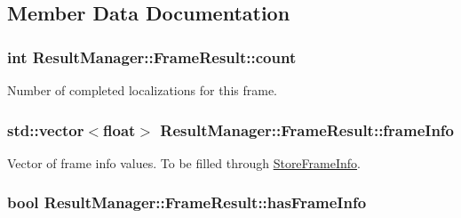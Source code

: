 \subsection{Member Data Documentation}
\subsubsection[{\texorpdfstring{count}{count}}]{\setlength{\rightskip}{0pt plus 5cm}int Result\+Manager\+::\+Frame\+Result\+::count}\hypertarget{struct_result_manager_1_1_frame_result_a0f8a4a4c5ba0eb70faa74b2074d1d7d1}{}\label{struct_result_manager_1_1_frame_result_a0f8a4a4c5ba0eb70faa74b2074d1d7d1}


Number of completed localizations for this frame. 

\subsubsection[{\texorpdfstring{frame\+Info}{frameInfo}}]{\setlength{\rightskip}{0pt plus 5cm}std\+::vector$<$float$>$ Result\+Manager\+::\+Frame\+Result\+::frame\+Info}\hypertarget{struct_result_manager_1_1_frame_result_a8ad3ac9ceb60b928bffae4e978b87eb0}{}\label{struct_result_manager_1_1_frame_result_a8ad3ac9ceb60b928bffae4e978b87eb0}


Vector of frame info values. To be filled through \hyperlink{class_result_manager_a0bbedc935395c1af29f175f81ab063c9}{Store\+Frame\+Info}. 

\subsubsection[{\texorpdfstring{has\+Frame\+Info}{hasFrameInfo}}]{\setlength{\rightskip}{0pt plus 5cm}bool Result\+Manager\+::\+Frame\+Result\+::has\+Frame\+Info}\hypertarget{struct_result_manager_1_1_frame_result_ac2f96ff6a7017bd7dd4a6e9ab14dbd0b}{}\label{struct_result_manager_1_1_frame_result_ac2f96ff6a7017bd7dd4a6e9ab14dbd0b}


